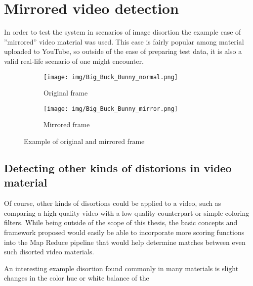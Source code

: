 \section{Mirrored video detection}
\label{sec:mirrored-video-detection}
In order to test the system in scenarios of image disortion the example case of ''mirrored'' video material was used. This case is fairly popular among material uploaded to YouTube, so outside of the ease of preparing test data, it is also a valid real-life scenario of one might encounter.

\begin{figure}
        \centering
        \begin{subfigure}[b]{0.45\textwidth}
                \texttt{[image: img/Big\_Buck\_Bunny\_normal.png]}
                \caption{Original frame}
                \label{fig:original-frame}
        \end{subfigure}
        \begin{subfigure}[b]{0.45\textwidth}
                \texttt{[image: img/Big\_Buck\_Bunny\_mirror.png]}
                \caption{Mirrored frame}
                \label{fig:mirrored-frame}
        \end{subfigure}
        \caption{Example of original and mirrored frame}\label{fig:frames-mirrored}
\end{figure}


\subsection{Detecting other kinds of distorions in video material}

Of course, other kinds of disortions could be applied to a video, such as comparing a high-quality video with a low-quality counterpart or simple coloring filters. While being outside of the scope of this thesis, the basic concepts and framework proposed would easily be able to incorporate more scoring functions into the Map Reduce pipeline that would help determine matches between even such disorted video materials. 

An interesting example disortion found commonly in many materials is slight changes in the color hue or white balance of the 


